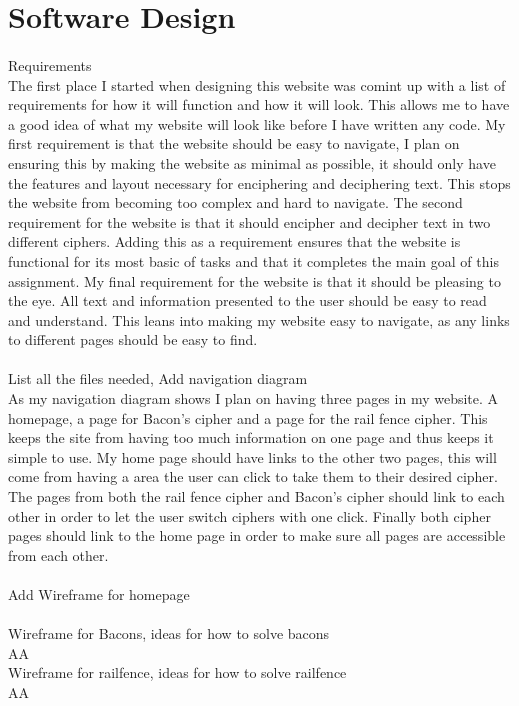 \documentclass[10pt, a4paper]{article}
\begin{document}
	\section{Software Design}
	\paragraph{}Requirements \\ The first place I started when designing this website was comint up with a list of requirements for how it will function and how it will look. This allows me to have a good idea of what my website will look like before I have written any code. My first requirement is that the website should be easy to navigate, I plan on ensuring this by making the website as minimal as possible, it should only have the features and layout necessary for enciphering and deciphering text. This stops the website from becoming too complex and hard to navigate. The second requirement for the website is that it should encipher and decipher text in two different ciphers. Adding this as a requirement ensures that the website is functional for its most basic of tasks and that it completes the main goal of this assignment. My final requirement for the website is that it should be pleasing to the eye. All text and information presented to the user should be easy to read and understand. This leans into making my website easy to navigate, as any links to different pages should be easy to find. 
	\paragraph{}List all the files needed, Add navigation diagram \\ As my navigation diagram shows I plan on having three pages in my website. A homepage, a page for Bacon's cipher and a page for the rail fence cipher. This keeps the site from having too much information on one page and thus keeps it simple to use. My home page should have links to the other two pages, this will come from having a area the user can click to take them to their desired cipher. The pages from both the rail fence cipher and Bacon's cipher should link to each other in order to let the user switch ciphers with one click. Finally both cipher pages should link to the home page in order to make sure all pages are accessible from each other.
	\paragraph{}Add Wireframe for homepage \\  \\Wireframe for Bacons, ideas for how to solve bacons \\ AA \\Wireframe for railfence, ideas for how to solve railfence \\ AA
	
\end{document}
